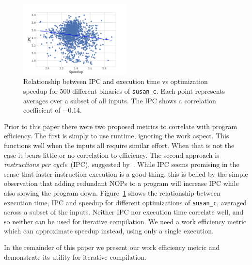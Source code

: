     \begin{figure}[t]
        \centering
        \includegraphics[width=0.5\textwidth]{figs/motivation-metric.pdf}
        \caption{
            Relationship between IPC and execution time vs optimization speedup for 500 different binaries of \texttt{susan\_c}.
            Each point represents averages over a subset of all inputs.
            The IPC shows a correlation coefficient of $-0.14$.
        }
        \label{fig:motivation-metric}
    \end{figure}

    Prior to this paper there were two proposed metrics to correlate with program efficiency. The first is simply to use runtime, ignoring
    the work aspect. This functions well when the inputs all require similar effort. When that is not the case it bears little or no
    correlation to efficiency. The second approach is \textit{instructions per cycle}~(IPC), suggested by~\citep{fursin07}. While IPC seems
    promising in the sense that faster instruction execution is a good thing, this is belied by the simple observation that adding
    redundant NOPs to a program will increase IPC while also slowing the program down. Figure~\ref{fig:motivation-metric} shows the
    relationship between execution time, IPC and speedup for different optimizations of \texttt{susan\_c}, averaged across a subset of the
    inputs. Neither IPC nor execution time correlate well, and so neither can be used for iterative compilation. We need a work efficiency
    metric which can approximate speedup instead, using only a single execution.

    In the remainder of this paper we present our work efficiency metric and demonstrate its utility for iterative compilation.
